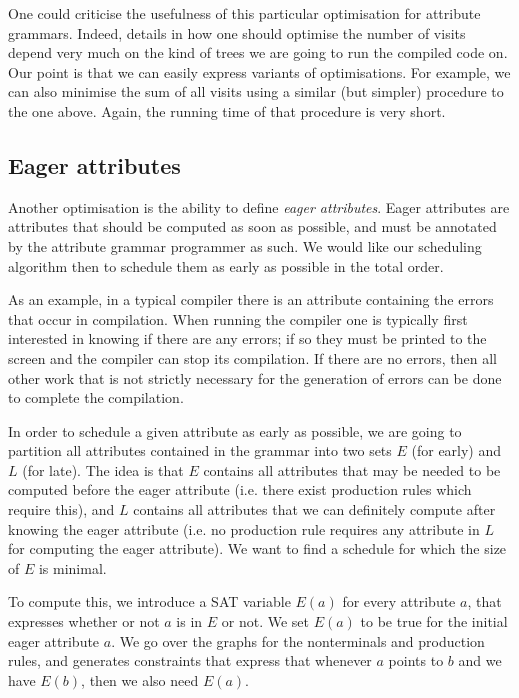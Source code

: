\documentclass{llncs}
\begin{document}
One could criticise the usefulness of this particular optimisation for attribute grammars. Indeed, details in how one should optimise the number of visits depend very much on the kind of trees we are going to run the compiled code on. Our point is that we can easily express variants of optimisations. For example, we can also minimise the sum of all visits using a similar (but simpler) procedure to the one above. Again, the running time of that procedure is very short.

\subsection{Eager attributes} \label{sect:eagerattributes}
Another optimisation is the ability to define \emph{eager attributes}. Eager attributes are attributes that should be computed as soon as possible, and must be annotated by the attribute grammar programmer as such. We would like our scheduling algorithm then to schedule them as early as possible in the total order.

As an example, in a typical compiler there is an attribute containing the errors that occur in compilation. When running the compiler one is typically first interested in knowing if there are any errors; if so they must be printed to the screen and the compiler can stop its compilation. If there are no errors, then all other work that is not strictly necessary for the generation of errors can be done to complete the compilation.

In order to schedule a given attribute as early as possible, we are going to partition all attributes contained in the grammar into two sets $E$ (for early) and $L$ (for late). The idea is that $E$ contains all attributes that may be needed to be computed before the eager attribute (i.e. there exist production rules which require this), and $L$ contains all attributes that we can definitely compute after knowing the eager attribute (i.e. no production rule requires any attribute in $L$ for computing the eager attribute). We want to find a schedule for which the size of $E$ is minimal.

To compute this, we introduce a SAT variable $E(a)$ for every attribute $a$, that expresses whether or not $a$ is in $E$ or not. We set $E(a)$ to be true for the initial eager attribute $a$. We go over the graphs for the nonterminals and production rules, and generates constraints that express that whenever $a$ points to $b$ and we have $E(b)$, then we also need $E(a)$.
\end{document}
